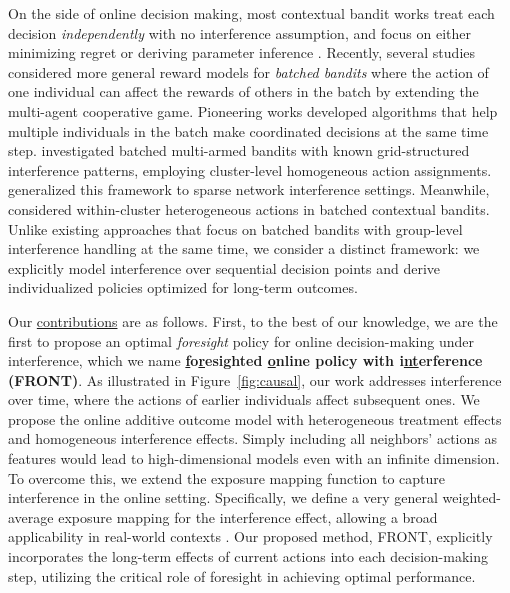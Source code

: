 \documentclass[12pt]{article}
\begin{document}
On the side of online decision making, most contextual bandit works treat each decision \textit{independently} with no interference assumption, and focus on either minimizing regret \citep[see e.g.,][]{li2011,agarwal2024} or deriving parameter inference \citep[see e.g.,][]{chen2021,shen2024}. Recently, several studies considered more general reward models for \textit{batched bandits} where the action of one individual can affect the rewards of others in the batch by extending the multi-agent cooperative game. Pioneering works \citep{bargiacchi2018,verstraeten2020,dubey2020} developed algorithms that help multiple individuals in the batch make coordinated decisions at the same time step. \cite{jia2024} investigated batched multi-armed bandits with known grid-structured interference patterns, employing cluster-level homogeneous action assignments. \cite{agarwal2024} generalized this framework to sparse network interference settings. Meanwhile, \cite{xu2024} considered within-cluster heterogeneous actions in batched contextual bandits. Unlike existing approaches that focus on batched bandits with group-level interference handling at the same time, we consider a distinct framework: we explicitly model interference over sequential decision points and derive individualized policies optimized for long-term outcomes. 

Our \underline{contributions} are as follows. {First}, to the best of our knowledge, we are the first to propose an optimal \textit{foresight} policy for online decision-making under interference, which we name \textbf{\underline{f}o\underline{r}esighted \underline{o}nline policy with i\underline{nt}erference (FRONT)}. As illustrated in Figure~\ref{fig:causal}, our work addresses interference over time, where the actions of earlier individuals affect subsequent ones. We propose the online additive outcome model with heterogeneous treatment effects and homogeneous interference effects. Simply including all neighbors' actions as features would lead to high-dimensional models even with an infinite dimension. To overcome this, we extend the exposure mapping function to capture interference in the online setting. Specifically, we define a very general weighted-average exposure mapping for the interference effect, allowing a broad applicability in real-world contexts \citep{zhao2015,hopfer2022}. Our proposed method, FRONT, explicitly incorporates the long-term effects of current actions into each decision-making step, utilizing the critical role of foresight in achieving optimal performance.
\end{document}

